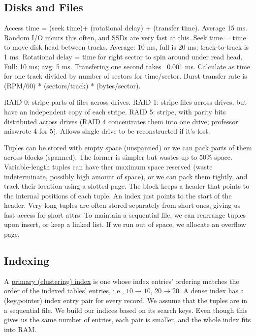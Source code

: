 \documentclass[10pt,letterpaper,twocolumn]{article}
\begin{document}
\subsection{Disks and Files}

Access time = (seek time)+ (rotational delay) + (transfer time). Average 15 ms. Random I/O incurs this often, and SSDs are very fast at this.
Seek time = time to move disk head between tracks. 
Average: 10 ms, full is 20 ms; track-to-track is 1 ms.
Rotational delay = time for right sector to spin 
around under read head. Full: 10 ms; avg: 5 ms.
Transfering one second takes ~0.001 ms. Calculate
as time for one track divided by number of sectors
for time/sector. 
Burst transfer rate is (RPM/60) * (sectors/track)
* (bytes/sector).

RAID 0: stripe parts of files across drives. 
RAID 1: stripe files across drives, but have an
independent copy of each stripe. 
RAID 5: stripe, with parity bits distributed across
drives (RAID 4 concentrates them into one drive; 
professor miswrote 4 for 5). Allows single drive to 
be reconstructed if it's lost.

Tuples can be stored with empty space (unspanned)
or we can pack parts of them across blocks (spanned). 
The former is simpler but wastes up to 50\% space.
Variable-length tuples can have ther maximum space
reserved (waste indeterminate, possibly high
amount of space), or we can pack them tightly, 
and track their location using a slotted page. 
The block keeps a header that points to the internal
positions of each tuple. An index just points
to the start of the header. Very long tuples 
are often stored separately from short ones, 
giving us fast access for short attrs.
To maintain a sequential file, we can rearrange tuples
upon insert, or keep a linked list. If we run out
of space, we allocate an overflow page.

\subsection{Indexing}

A \underline{primary (clustering) index} is one 
whose index entries' ordering matches the order of 
the indexed tables' entries, i.e., $ 10 \to 10 $, 
$ 20 \to 20 $. A \underline{dense index} has a 
(key,pointer) index entry pair for every record.
We assume that the tuples are in a sequential file. 
We build our indices based on its search keys.
Even though this gives us the same number of 
entries, each pair is smaller, and the whole index
fits into RAM. 
\end{document}
